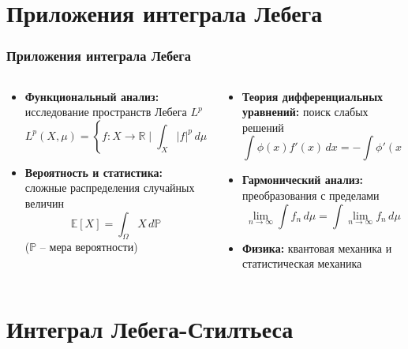 \documentclass[aspectratio=169]{beamer}
\begin{document}
\section{Приложения интеграла Лебега}

\begin{frame}
\frametitle{Приложения интеграла Лебега}
\begin{columns}[c]
    \begin{column}{0.5\textwidth}
        \begin{itemize}
            \item \textbf{Функциональный анализ:} исследование пространств Лебега $L^p$
            $$
            L^p(X, \mu) = \left\{ f: X \to \mathbb{R} \mid \int_X |f|^p \, d\mu < \infty \right\}
            $$
            \item \textbf{Вероятность и статистика:} сложные распределения случайных величин
            $$
            \mathbb{E}[X] = \int_\Omega X \, d\mathbb{P}
            $$
            ($\mathbb{P}$ -- мера вероятности)
        \end{itemize}
    \end{column}
    \begin{column}{0.5\textwidth}
        \begin{itemize}
            \item \textbf{Теория дифференциальных уравнений:} поиск слабых решений
            $$
            \int \phi(x) f'(x) \, dx = -\int \phi'(x) f(x) \, dx
            $$
            \item \textbf{Гармонический анализ:} преобразования с пределами
            $$
            \lim_{n \to \infty} \int f_n \, d\mu = \int \lim_{n \to \infty} f_n \, d\mu
            $$
            \item \textbf{Физика:} квантовая механика и статистическая механика
        \end{itemize}
    \end{column}
\end{columns}
\end{frame}

\section{Интеграл Лебега-Стилтьеса}
\end{document}

